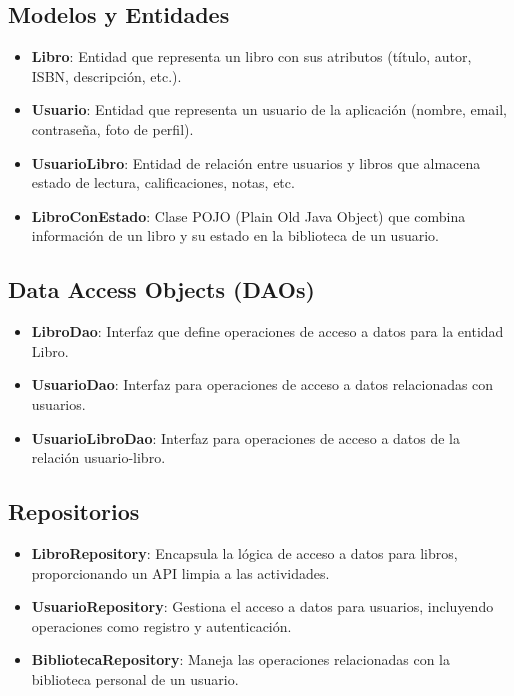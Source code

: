 \documentclass[a4paper,12pt]{report}
\begin{document}
      \subsection{Modelos y Entidades}
      \begin{itemize}
        \item \textbf{Libro}: Entidad que representa un libro con sus atributos (título, autor, ISBN, descripción, etc.).
        \item \textbf{Usuario}: Entidad que representa un usuario de la aplicación (nombre, email, contraseña, foto de perfil).
        \item \textbf{UsuarioLibro}: Entidad de relación entre usuarios y libros que almacena estado de lectura, calificaciones, notas, etc.
        \item \textbf{LibroConEstado}: Clase POJO (Plain Old Java Object) que combina información de un libro y su estado en la biblioteca de un usuario.
      \end{itemize}
      \subsection{Data Access Objects (DAOs)}
      \begin{itemize}
        \item \textbf{LibroDao}: Interfaz que define operaciones de acceso a datos para la entidad Libro.
        \item \textbf{UsuarioDao}: Interfaz para operaciones de acceso a datos relacionadas con usuarios.
        \item \textbf{UsuarioLibroDao}: Interfaz para operaciones de acceso a datos de la relación usuario-libro.
      \end{itemize}
      \subsection{Repositorios}
      \begin{itemize}
        \item \textbf{LibroRepository}: Encapsula la lógica de acceso a datos para libros, proporcionando un API limpia a las actividades.
        \item \textbf{UsuarioRepository}: Gestiona el acceso a datos para usuarios, incluyendo operaciones como registro y autenticación.
        \item \textbf{BibliotecaRepository}: Maneja las operaciones relacionadas con la biblioteca personal de un usuario.
      \end{itemize}
\end{document}
